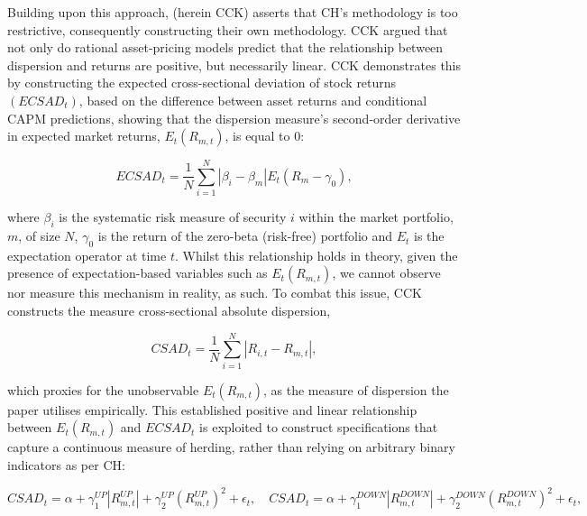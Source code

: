 \documentclass[12pt]{article}
\numberwithin{table}{section}   %
\begin{document}
Building upon this approach, \citet{cck} (herein CCK) asserts that CH’s methodology is too restrictive, consequently constructing their own methodology. CCK argued that not only do rational asset-pricing models predict that the relationship between dispersion and returns are positive, but necessarily linear. CCK demonstrates this by constructing the expected cross-sectional deviation of stock returns $(ECSAD_t)$, based on the difference between asset returns and conditional CAPM predictions, showing that the dispersion measure’s second-order derivative in expected market returns, $E_t(R_{m,t})$, is equal to 0:

$$
ECSAD_t=\frac{1}{N}\sum^N_{i=1}|\beta_i-\beta_m|E_t(R_m-\gamma_0),
$$

where $\beta_i$ is the systematic risk measure of security $i$ within the market portfolio, $m$, of size $N$, $\gamma_0$ is the return of the zero-beta (risk-free) portfolio and $E_t$ is the expectation operator at time $t$. Whilst this relationship holds in theory, given the presence of expectation-based variables such as $E_t(R_{m,t})$, we cannot observe nor measure this mechanism in reality, as such. To combat this issue, CCK constructs the measure cross-sectional absolute dispersion,

$$
CSAD_t=\frac{1}{N}\sum^N_{i=1}|R_{i,t}-R_{m,t}|,
$$

which proxies for the unobservable $E_t(R_{m,t})$, as the measure of dispersion the paper utilises empirically. This established positive and linear relationship between $E_t(R_{m,t})$ and $ECSAD_t$ is exploited to construct specifications that capture a continuous measure of herding, rather than relying on arbitrary binary indicators as per CH:

$$
CSAD_t=\alpha+\gamma_1^{UP}|R_{m,t}^{UP}|+\gamma_2^{UP}(R_{m,t}^{UP})^2+\epsilon_t, \quad CSAD_t=\alpha+\gamma_1^{DOWN}|R_{m,t}^{DOWN}|+\gamma_2^{DOWN}(R_{m,t}^{DOWN})^2+\epsilon_t,
$$
\end{document}
